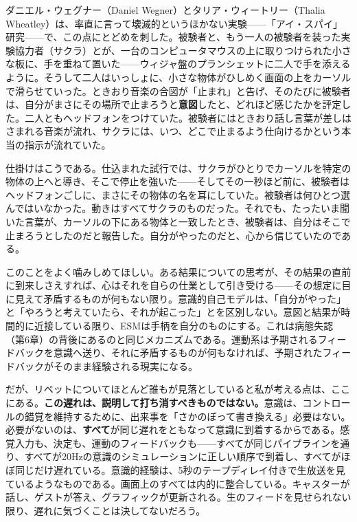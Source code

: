 \documentclass[11pt, twoside, openright]{book}
\begin{document}
ダニエル・ウェグナー（Daniel Wegner）とタリア・ウィートリー（Thalia Wheatley）は、率直に言って壊滅的というほかない実験------「アイ・スパイ」研究------で、この点にとどめを刺した。被験者と、もう一人の被験者を装った実験協力者（サクラ）とが、一台のコンピュータマウスの上に取りつけられた小さな板に、手を重ねて置いた------ウィジャ盤のプランシェットに二人で手を添えるように。そうして二人はいっしょに、小さな物体がひしめく画面の上をカーソルで滑らせていった。ときおり音楽の合図が「止まれ」と告げ、そのたびに被験者は、自分がまさにその場所で止まろうと\textbf{意図}したと、どれほど感じたかを評定した。二人ともヘッドフォンをつけていた。被験者にはときおり話し言葉が差しはさまれる音楽が流れ、サクラには、いつ、どこで止まるよう仕向けるかという本当の指示が流れていた。

仕掛けはこうである。仕込まれた試行では、サクラがひとりでカーソルを特定の物体の上へと導き、そこで停止を強いた------そしてその一秒ほど前に、被験者はヘッドフォンごしに、まさにその物体の名を耳にしていた。被験者は何ひとつ選んではいなかった。動きはすべてサクラのものだった。それでも、たったいま聞いた言葉が、カーソルの下にある物体と一致したとき、被験者は、自分はそこで止まろうとしたのだと報告した。自分がやったのだと、心から信じていたのである。

このことをよく噛みしめてほしい。ある結果についての思考が、その結果の直前に到来しさえすれば、心はそれを自らの仕業として引き受ける------その想定に目に見えて矛盾するものが何もない限り。意識的自己モデルは、「自分がやった」と「やろうと考えていたら、それが起こった」とを区別しない。意図と結果が時間的に近接している限り、ESMは手柄を自分のものにする。これは病態失認（第6章）の背後にあるのと同じメカニズムである。運動系は予期されるフィードバックを意識へ送り、それに矛盾するものが何もなければ、予期されたフィードバックがそのまま経験される現実になる。

だが、リベットについてほとんど誰もが見落としていると私が考える点は、ここにある。\textbf{この遅れは、説明して打ち消すべきものではない。}意識は、コントロールの錯覚を維持するために、出来事を「さかのぼって書き換える」必要はない。必要がないのは、\textbf{すべて}が同じ遅れをともなって意識に到着するからである。感覚入力も、決定も、運動のフィードバックも------すべてが同じパイプラインを通り、すべてが20Hzの意識のシミュレーションに正しい順序で到着し、すべてがほぼ同じだけ遅れている。意識的経験は、5秒のテープディレイ付きで生放送を見ているようなものである。画面上のすべては内的に整合している。キャスターが話し、ゲストが答え、グラフィックが更新される。生のフィードを見せられない限り、遅れに気づくことは決してないだろう。
\end{document}

